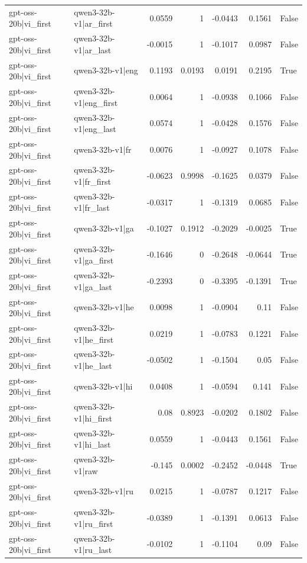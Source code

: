 \begin{table}
\begin{tabular}{l l r r r r l}
gpt-oss-20b|vi_first & qwen3-32b-v1|ar_first & 0.0559 & 1 & -0.0443 & 0.1561 & False \\
gpt-oss-20b|vi_first & qwen3-32b-v1|ar_last & -0.0015 & 1 & -0.1017 & 0.0987 & False \\
gpt-oss-20b|vi_first & qwen3-32b-v1|eng & 0.1193 & 0.0193 & 0.0191 & 0.2195 & True \\
gpt-oss-20b|vi_first & qwen3-32b-v1|eng_first & 0.0064 & 1 & -0.0938 & 0.1066 & False \\
gpt-oss-20b|vi_first & qwen3-32b-v1|eng_last & 0.0574 & 1 & -0.0428 & 0.1576 & False \\
gpt-oss-20b|vi_first & qwen3-32b-v1|fr & 0.0076 & 1 & -0.0927 & 0.1078 & False \\
gpt-oss-20b|vi_first & qwen3-32b-v1|fr_first & -0.0623 & 0.9998 & -0.1625 & 0.0379 & False \\
gpt-oss-20b|vi_first & qwen3-32b-v1|fr_last & -0.0317 & 1 & -0.1319 & 0.0685 & False \\
gpt-oss-20b|vi_first & qwen3-32b-v1|ga & -0.1027 & 0.1912 & -0.2029 & -0.0025 & True \\
gpt-oss-20b|vi_first & qwen3-32b-v1|ga_first & -0.1646 & 0 & -0.2648 & -0.0644 & True \\
gpt-oss-20b|vi_first & qwen3-32b-v1|ga_last & -0.2393 & 0 & -0.3395 & -0.1391 & True \\
gpt-oss-20b|vi_first & qwen3-32b-v1|he & 0.0098 & 1 & -0.0904 & 0.11 & False \\
gpt-oss-20b|vi_first & qwen3-32b-v1|he_first & 0.0219 & 1 & -0.0783 & 0.1221 & False \\
gpt-oss-20b|vi_first & qwen3-32b-v1|he_last & -0.0502 & 1 & -0.1504 & 0.05 & False \\
gpt-oss-20b|vi_first & qwen3-32b-v1|hi & 0.0408 & 1 & -0.0594 & 0.141 & False \\
gpt-oss-20b|vi_first & qwen3-32b-v1|hi_first & 0.08 & 0.8923 & -0.0202 & 0.1802 & False \\
gpt-oss-20b|vi_first & qwen3-32b-v1|hi_last & 0.0559 & 1 & -0.0443 & 0.1561 & False \\
gpt-oss-20b|vi_first & qwen3-32b-v1|raw & -0.145 & 0.0002 & -0.2452 & -0.0448 & True \\
gpt-oss-20b|vi_first & qwen3-32b-v1|ru & 0.0215 & 1 & -0.0787 & 0.1217 & False \\
gpt-oss-20b|vi_first & qwen3-32b-v1|ru_first & -0.0389 & 1 & -0.1391 & 0.0613 & False \\
gpt-oss-20b|vi_first & qwen3-32b-v1|ru_last & -0.0102 & 1 & -0.1104 & 0.09 & False \\

\end{tabular}
\end{table}
